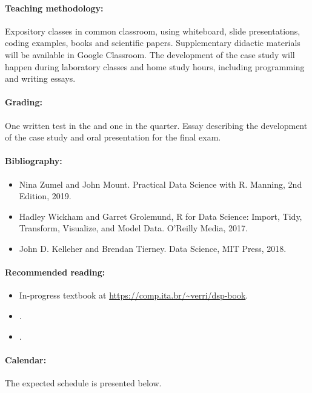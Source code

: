 \paragraph{Teaching methodology:}
Expository classes in common classroom, using whiteboard, slide presentations, coding
examples, books and scientific papers. Supplementary didactic materials will be available
in Google Classroom. The development of the case study will happen during laboratory
classes and home study hours, including programming and writing essays.

\paragraph{Grading:} One written test in the  and one in the  quarter.
Essay describing the development of the case study and oral presentation for the final
exam.

\paragraph{Bibliography:}
\begin{itemize}
  \item Nina Zumel and John Mount. Practical Data Science with R. Manning, 2nd Edition, 2019.
  \item Hadley Wickham and Garret Grolemund, R for Data Science: Import, Tidy, Transform, Visualize, and Model Data. O’Reilly Media, 2017.
  \item John D. Kelleher and Brendan Tierney. Data Science, MIT Press, 2018.
\end{itemize}

\thispagestyle{empty}
\paragraph{Recommended reading:}
\begin{itemize}
  \item In-progress textbook at \url{https://comp.ita.br/~verri/dsp-book}.
  \item {}.
  \item {}.
\end{itemize}

\paragraph{Calendar:} The expected schedule is presented below.


